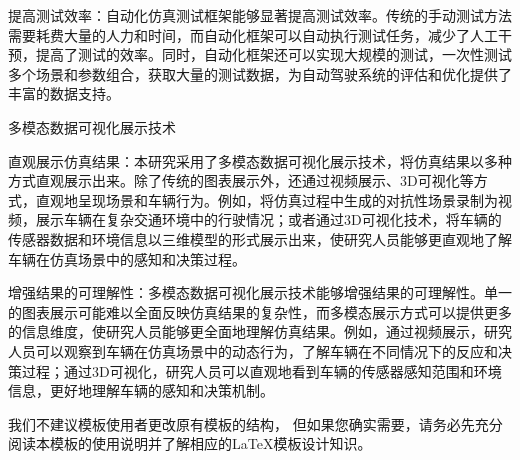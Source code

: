 提高测试效率：自动化仿真测试框架能够显著提高测试效率。传统的手动测试方法需要耗费大量的人力和时间，而自动化框架可以自动执行测试任务，减少了人工干预，提高了测试的效率。同时，自动化框架还可以实现大规模的测试，一次性测试多个场景和参数组合，获取大量的测试数据，为自动驾驶系统的评估和优化提供了丰富的数据支持。

多模态数据可视化展示技术

直观展示仿真结果：本研究采用了多模态数据可视化展示技术，将仿真结果以多种方式直观展示出来。除了传统的图表展示外，还通过视频展示、3D可视化等方式，直观地呈现场景和车辆行为。例如，将仿真过程中生成的对抗性场景录制为视频，展示车辆在复杂交通环境中的行驶情况；或者通过3D可视化技术，将车辆的传感器数据和环境信息以三维模型的形式展示出来，使研究人员能够更直观地了解车辆在仿真场景中的感知和决策过程。

增强结果的可理解性：多模态数据可视化展示技术能够增强结果的可理解性。单一的图表展示可能难以全面反映仿真结果的复杂性，而多模态展示方式可以提供更多的信息维度，使研究人员能够更全面地理解仿真结果。例如，通过视频展示，研究人员可以观察到车辆在仿真场景中的动态行为，了解车辆在不同情况下的反应和决策过程；通过3D可视化，研究人员可以直观地看到车辆的传感器感知范围和环境信息，更好地理解车辆的感知和决策机制。

我们不建议模板使用者更改原有模板的结构，
但如果您确实需要，请务必先充分阅读本模板的使用说明并了解相应的\LaTeX{}模板设计知识。

